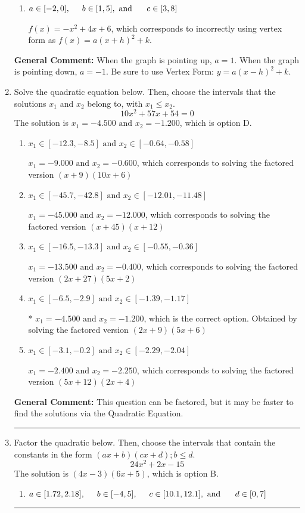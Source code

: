 \documentclass{extbook}[14pt]
\newcommand{\litem}[1]{\item #1

\rule{\textwidth}{0.4pt}}
\begin{document}
\begin{enumerate}
{\begin{enumerate}[label=\Alph*.]
$f(x)=x^{2} -4 x + 14$, which corresponds to incorrectly using vertex form as $f(x) = a(x+h)^2+k$ AND making $a$ the opposite sign than it should be.
\item \( a \in [-2, 0], \hspace*{5mm} b \in [1, 5], \text{ and } \hspace*{5mm} c \in [3, 8] \)

$f(x)=-x^{2} +4 x + 6$, which corresponds to incorrectly using vertex form as $f(x) = a(x+h)^2+k$.
\end{enumerate}

\textbf{General Comment:} When the graph is pointing up, $a=1$. When the graph is pointing down, $a=-1$. Be sure to use Vertex Form: $y = a(x-h)^2+k$.
}
\litem{
Solve the quadratic equation below. Then, choose the intervals that the solutions $x_1$ and $x_2$ belong to, with $x_1 \leq x_2$.
\[ 10x^{2} +57 x + 54 = 0 \]The solution is \( x_1 = -4.500 \text{ and } x_2 = -1.200 \), which is option D.\begin{enumerate}[label=\Alph*.]
\item \( x_1 \in [-12.3, -8.5] \text{ and } x_2 \in [-0.64, -0.58] \)

$x_1 = -9.000 \text{ and } x_2 = -0.600$, which corresponds to solving the factored version $(x + 9)(10x + 6)$
\item \( x_1 \in [-45.7, -42.8] \text{ and } x_2 \in [-12.01, -11.48] \)

$x_1 = -45.000 \text{ and } x_2 = -12.000$, which corresponds to solving the factored version $(x + 45)(x + 12)$
\item \( x_1 \in [-16.5, -13.3] \text{ and } x_2 \in [-0.55, -0.36] \)

$x_1 = -13.500 \text{ and } x_2 = -0.400$, which corresponds to solving the factored version $(2x + 27)(5x + 2)$
\item \( x_1 \in [-6.5, -2.9] \text{ and } x_2 \in [-1.39, -1.17] \)

* $x_1 = -4.500 \text{ and } x_2 = -1.200$, which is the correct option. Obtained by solving the factored version $(2x + 9)(5x + 6)$
\item \( x_1 \in [-3.1, -0.2] \text{ and } x_2 \in [-2.29, -2.04] \)

$x_1 = -2.400 \text{ and } x_2 = -2.250$, which corresponds to solving the factored version $(5x + 12)(2x + 4)$
\end{enumerate}

\textbf{General Comment:} This question can be factored, but it may be faster to find the solutions via the Quadratic Equation.
}
\litem{
Factor the quadratic below. Then, choose the intervals that contain the constants in the form $(ax+b)(cx+d); b \leq d.$
\[ 24x^{2} +2 x -15 \]The solution is \( (4x -3)(6x + 5) \), which is option B.\begin{enumerate}[label=\Alph*.]
\item \( a \in [1.72, 2.18], \hspace*{5mm} b \in [-4, 5], \hspace*{5mm} c \in [10.1, 12.1], \text{ and } \hspace*{5mm} d \in [0, 7] \)


\end{enumerate}}
\end{enumerate}
\end{document}
